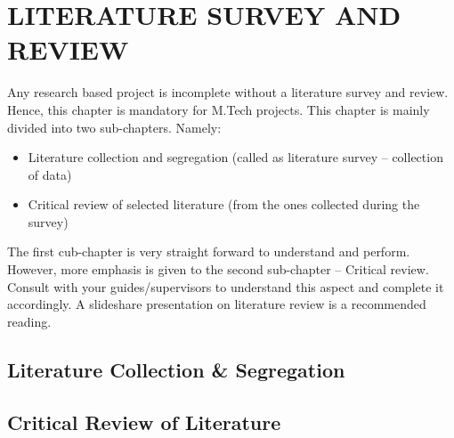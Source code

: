 
\chapter{LITERATURE SURVEY AND REVIEW} %
\label{ChapterLiteratureSurvey} %

Any research based project is incomplete without a literature survey and review. Hence, this chapter is mandatory for M.Tech projects. This chapter is mainly divided into two sub-chapters. Namely:

\begin{itemize}
	\item Literature collection and segregation (called as literature survey – collection of data)
	\item Critical review of selected literature (from the ones collected during the survey)	
\end{itemize}

The first cub-chapter is very straight forward to understand and perform. However, more emphasis is given to the second sub-chapter – Critical review. Consult with your guides/supervisors to understand this aspect and complete it accordingly. A slideshare presentation on literature review is a recommended reading. \cite{Reference1}

\section{Literature Collection \& Segregation}


\section{Critical Review of Literature}

